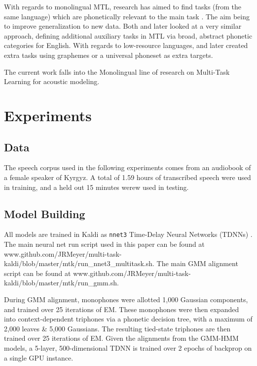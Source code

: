 \documentclass[a4paper]{article}
\begin{document}
With regards to monolingual MTL, research has aimed to find tasks (from the same language) which are phonetically relevant to the main task \cite{bell2015}. The aim being to improve generalization to new data. Both \cite{seltzer2013} and later \cite{huang2015} looked at a very similar approach, defining additional auxiliary tasks in MTL via broad, abstract phonetic categories for English. With regards to low-resource languages, \cite{chen2014} and later \cite{chen2015} created extra tasks using graphemes or a universal phoneset as extra targets.

The current work falls into the Monolingual line of research on Multi-Task Learning for acoustic modeling.


\section{Experiments}


\subsection{Data}

The speech corpus used in the following experiments comes from an audiobook of a female speaker of Kyrgyz. A total of 1.59 hours of transcribed speech were used in training, and a held out 15 minutes werew used in testing.


\subsection{Model Building}

All models are trained in Kaldi as \texttt{nnet3} Time-Delay Neural Networks (TDNNs) \cite{povey2011,peddinti2015}. The main neural net run script used in this paper can be found at www.github.com/JRMeyer/multi-task-kaldi/blob/master/mtk/run\_nnet3\_multitask.sh. The main GMM alignment script can be found at www.github.com/JRMeyer/multi-task-kaldi/blob/master/mtk/run\_gmm.sh.

During GMM alignment, monophones were allotted 1,000 Gaussian components, and trained over 25 iterations of EM. These monophones were then expanded into context-dependent triphones via a phonetic decision tree, with a maximum of 2,000 leaves \& 5,000 Gaussians. The resulting tied-state triphones are then trained over 25 iterations of EM. Given the alignments from the GMM-HMM models, a 5-layer, 500-dimensional TDNN is trained over 2 epochs of backprop on a single GPU instance.
\end{document}
